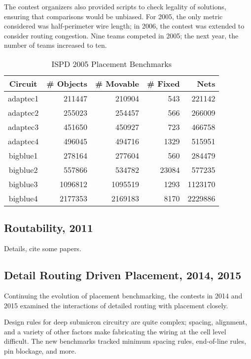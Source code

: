 \documentclass[sigconf]{acmart}
\begin{document}
The contest organizers also provided scripts to
check legality of solutions, ensuring that comparisons
would be unbiased.  For 2005, the only metric
considered was half-perimeter wire length; in 2006,
the contest was extended to consider routing congestion.
Nine teams competed in 2005; the next year, the number
of teams increased to ten.

\begin{table}
  \caption{ISPD 2005 Placement Benchmarks}
  \begin{tabular}{|c||r|r|r|r|}\hline
    Circuit & \# Objects & \# Movable & \# Fixed & Nets \\ \hline
adaptec1 & 211447 & 210904 & 543 & 221142  \\
adaptec2 & 255023 & 254457 & 566 & 266009  \\
adaptec3 & 451650 & 450927 & 723 & 466758  \\
adaptec4 & 496045 & 494716 & 1329 & 515951  \\
bigblue1 & 278164 & 277604 & 560 & 284479  \\
bigblue2 & 557866 & 534782 & 23084 & 577235  \\
bigblue3 & 1096812 & 1095519 & 1293 & 1123170  \\
bigblue4 & 2177353 & 2169183 & 8170 & 2229886  \\ \hline
\end{tabular}
\end{table}


\subsection{Routability, 2011}


Details, cite some papers.

\subsection{Detail Routing Driven Placement, 2014, 2015}

Continuing the evolution of placement benchmarking,
the contests in 2014 and 2015 examined the interactions
of detailed routing with placement closely\cite{Yutsis14,Bustany15}.

Design rules for deep submicron circuitry are quite complex;
spacing, alignment, and a variety of other factors make
fabricating the wiring at the cell level difficult.  The new
benchmarks tracked minimum spacing rules, end-of-line rules,
pin blockage, and more.
\end{document}
